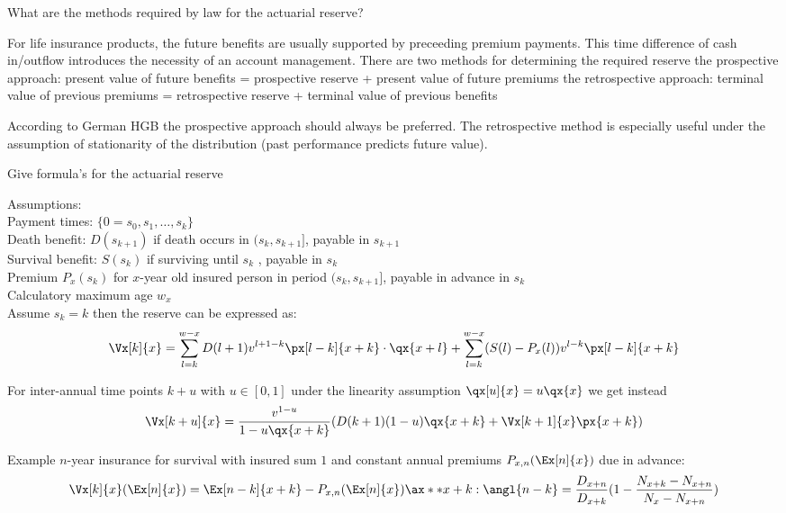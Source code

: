 \documentclass[11pt,a4paper,twoside]{article}
\begin{document}

What are the methods required by law for the actuarial reserve?

For life insurance products, the future benefits are usually supported by preceeding
premium payments. This time difference of cash in/outflow introduces the necessity of an account management.
There are two methods for determining the required reserve
the prospective approach:
present value of future benefits = prospective reserve + present value of future premiums
the retrospective approach:
terminal value of previous premiums = retrospective reserve + terminal value of previous benefits

According to German HGB the prospective approach should always be preferred. The retrospective method
is especially useful under the assumption of stationarity of the distribution (past performance predicts future value).


Give formula's for the actuarial reserve 

Assumptions: \\
Payment times: \( \{0 = s_0, s_1, \dots, s_k \}\) \\
Death benefit: \( D(s_{k+1}) \) if death occurs in \( (s_k, s_{k+1}] \), payable in \( s_{k+1} \) \\
Survival benefit: \( S(s_k) \) if surviving until \( s_k \) , payable in \( s_k \) \\
Premium \( P_x(s_k) \) for \( x \)-year old insured person in period \( (s_k , s_{k+1}] \), payable in advance in \( s_k \) \\
Calculatory maximum age \( w_x \)  \\

Assume \( s_k = k \) then the reserve can be expressed as: 
\[ 
\Vx[k]{x} = \sum_{l=k}^{w - x} D(l + 1)v^{l + 1 - k} \px[l - k]{x + k} \cdot \qx{x + l} + \sum_{l = k}^{w - x} (S(l) - P_x(l)) v^{l - k} \px[l - k]{x + k}
\]

For inter-annual time points \( k + u \) with \( u \in [0, 1] \) under the linearity assumption \( \qx[u]{x} = u \qx{x} \)
we get instead
\[ \Vx[k + u]{x} = \frac{v^{1-u}}{1 - u\qx{x+k}} (D(k+1)(1 - u)\qx{x+k} + \Vx[k+1]{x} \px{x+k}) \]

Example \( n \)-year insurance for survival with insured sum \( 1 \) and constant annual premiums
\( P_{x,n}(\Ex[n]{x}) \) due in advance:
\[ \Vx[k]{x}(\Ex[n]{x}) = \Ex[n-k]{x+k} - P_{x,n}(\Ex[n]{x})\ax**{x+k: \angl{n - k}} = \frac{D_{x+n}}{D_{x+k}}(1 - \frac{N_{x+k} - N_{x+n}}{N_x - N_{x+n}}) \]
\end{document}
